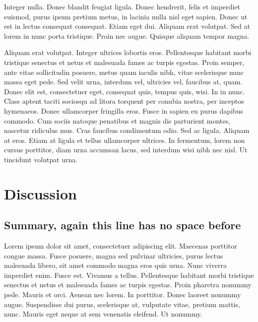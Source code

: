 \documentclass{biorxiv}
\begin{document}
Integer nulla. Donec blandit feugiat ligula. Donec hendrerit, felis et
imperdiet euismod, purus ipsum pretium metus, in lacinia nulla nisl eget
sapien. Donec ut est in lectus consequat consequat. Etiam eget dui. Aliquam
erat volutpat. Sed at lorem in nunc porta tristique. Proin nec augue. Quisque
aliquam tempor magna.

Aliquam erat volutpat. Integer ultrices lobortis eros. Pellentesque habitant
morbi tristique senectus et netus et malesuada fames ac turpis egestas. Proin
semper, ante vitae sollicitudin posuere, metus quam iaculis nibh, vitae
scelerisque nunc massa eget pede. Sed velit urna, interdum vel, ultricies vel,
faucibus at, quam. Donec elit est, consectetuer eget, consequat quis, tempus
quis, wisi. In in nunc. Class aptent taciti sociosqu ad litora torquent per
conubia nostra, per inceptos hymenaeos. Donec ullamcorper fringilla eros.
Fusce in sapien eu purus dapibus commodo. Cum sociis natoque penatibus et
magnis dis parturient montes, nascetur ridiculus mus. Cras faucibus
condimentum odio. Sed ac ligula. Aliquam at eros. Etiam at ligula et tellus
ullamcorper ultrices. In fermentum, lorem non cursus porttitor, diam urna
accumsan lacus, sed interdum wisi nibh nec nisl. Ut tincidunt volutpat urna.

\section{Discussion}
\subsection{Summary, again this line has no space before}
Lorem ipsum dolor sit amet, consectetuer adipiscing elit. Maecenas porttitor
congue massa. Fusce posuere, magna sed pulvinar ultricies, purus lectus
malesuada libero, sit amet commodo magna eros quis urna. Nunc viverra
imperdiet enim. Fusce est. Vivamus a tellus. Pellentesque habitant morbi
tristique senectus et netus et malesuada fames ac turpis egestas. Proin
pharetra nonummy pede. Mauris et orci. Aenean nec lorem. In porttitor. Donec
laoreet nonummy augue. Suspendisse dui purus, scelerisque at, vulputate vitae,
pretium mattis, nunc. Mauris eget neque at sem venenatis eleifend. Ut nonummy.
\end{document}
